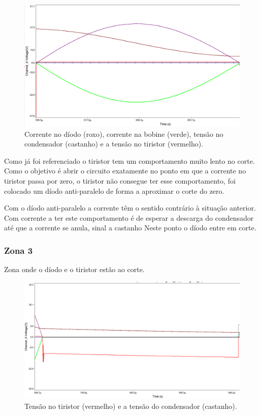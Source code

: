 \documentclass[a4paper,11pt]{article}
\numberwithin{equation}{section}
\begin{document}
	\begin{figure}[h]
		\centering
		\includegraphics[keepaspectratio=true, scale=0.4]{img/Zona2}
		\caption{Corrente no díodo (roxo), corrente na bobine (verde), tensão no condensador (castanho) e a tensão no tiristor (vermelho).}
		\label{fig:figura 2}
		\vspace{-0.8em}
	\end{figure}
	
	Como já  foi referenciado o tiristor tem um comportamento muito lento no corte. Como o objetivo é abrir o circuito exatamente no ponto em que a corrente no tiristor passa por zero, o tiristor não consegue ter esse comportamento, foi colocado um díodo anti-paralelo de forma a aproximar o corte do zero.    
	
	Com o díodo anti-paralelo a corrente têm o sentido contrário à situação anterior. Com corrente a ter este comportamento é de esperar a descarga do condensador até que a corrente se anula, sinal a castanho Neste ponto o díodo entre em corte.

	
\subsubsection*{Zona 3}
	Zona onde o díodo e o tiristor estão ao corte.
	
	\begin{figure}[h]
		\centering
		\includegraphics[keepaspectratio=true, scale=0.4]{img/Zona3}
		\caption{Tensão no tiristor (vermelho) e a tensão do condensador (castanho).}
		\label{fig:figura 3}
		\vspace{-0.8em}
	\end{figure}
	
\end{document}
